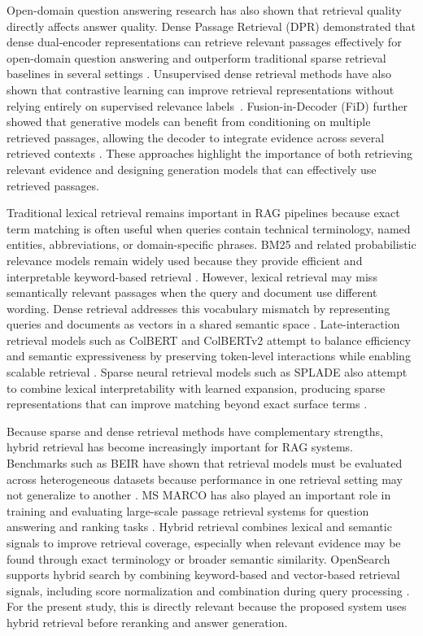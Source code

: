 Open-domain question answering research has also shown that retrieval quality directly affects answer quality. Dense Passage Retrieval (DPR) demonstrated that dense dual-encoder representations can retrieve relevant passages effectively for open-domain question answering and outperform traditional sparse retrieval baselines in several settings \cite{karpukhin2020dpr}. Unsupervised dense retrieval methods have also shown that contrastive learning can improve retrieval representations without relying entirely on supervised relevance labels~\cite{izacard2022contriever}. Fusion-in-Decoder (FiD) further showed that generative models can benefit from conditioning on multiple retrieved passages, allowing the decoder to integrate evidence across several retrieved contexts \cite{izacard2021fid}. These approaches highlight the importance of both retrieving relevant evidence and designing generation models that can effectively use retrieved passages.

Traditional lexical retrieval remains important in RAG pipelines because exact term matching is often useful when queries contain technical terminology, named entities, abbreviations, or domain-specific phrases. BM25 and related probabilistic relevance models remain widely used because they provide efficient and interpretable keyword-based retrieval \cite{robertson2009bm25}. However, lexical retrieval may miss semantically relevant passages when the query and document use different wording. Dense retrieval addresses this vocabulary mismatch by representing queries and documents as vectors in a shared semantic space \cite{karpukhin2020dpr}. Late-interaction retrieval models such as ColBERT and ColBERTv2 attempt to balance efficiency and semantic expressiveness by preserving token-level interactions while enabling scalable retrieval \cite{khattab2020colbert,santhanam2022colbertv2}. Sparse neural retrieval models such as SPLADE also attempt to combine lexical interpretability with learned expansion, producing sparse representations that can improve matching beyond exact surface terms \cite{formal2021splade}.

Because sparse and dense retrieval methods have complementary strengths, hybrid retrieval has become increasingly important for RAG systems. Benchmarks such as BEIR have shown that retrieval models must be evaluated across heterogeneous datasets because performance in one retrieval setting may not generalize to another \cite{thakur2021beir}. MS MARCO has also played an important role in training and evaluating large-scale passage retrieval systems for question answering and ranking tasks \cite{bajaj2016msmarco}. Hybrid retrieval combines lexical and semantic signals to improve retrieval coverage, especially when relevant evidence may be found through exact terminology or broader semantic similarity. OpenSearch supports hybrid search by combining keyword-based and vector-based retrieval signals, including score normalization and combination during query processing \cite{opensearchhybrid}. For the present study, this is directly relevant because the proposed system uses hybrid retrieval before reranking and answer generation.


